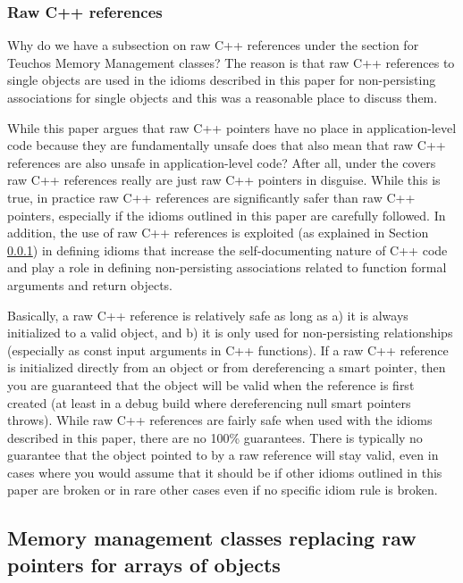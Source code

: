 \documentclass[pdf,ps2pdf,11pt]{SANDreport}
\begin{document}
%
{}\subsubsection{Raw C++ references}
\label{sec:raw-C++-references}
%

Why do we have a subsection on raw C++ references under the section
for Teuchos Memory Management classes?  The reason is that raw C++
references to single objects are used in the idioms described in this
paper for non-persisting associations for single objects and this was
a reasonable place to discuss them.

While this paper argues that raw C++ pointers have no place in
application-level code because they are fundamentally unsafe does that
also mean that raw C++ references are also unsafe in application-level
code?  After all, under the covers raw C++ references really are just
raw C++ pointers in disguise.  While this is true, in practice raw C++
references are significantly safer than raw C++ pointers, especially
if the idioms outlined in this paper are carefully followed.  In
addition, the use of raw C++ references is exploited (as explained in
Section {}\ref{sec:raw-C++-references}) in defining idioms that
increase the self-documenting nature of C++ code and play a role in
defining non-persisting associations related to function formal
arguments and return objects.

Basically, a raw C++ reference is relatively safe as long as a) it is
always initialized to a valid object, and b) it is only used for
non-persisting relationships (especially as const input arguments in
C++ functions).  If a raw C++ reference is initialized directly from an
object or from dereferencing a smart pointer, then you are guaranteed
that the object will be valid when the reference is first created (at
least in a debug build where dereferencing null smart pointers
throws).  While raw C++ references are fairly safe when used with the
idioms described in this paper, there are no 100\% guarantees.  There
is typically no guarantee that the object pointed to by a raw reference
will stay valid, even in cases where you would assume that it should
be if other idioms outlined in this paper are broken or in rare other
cases even if no specific idiom rule is broken.


%
{}\subsection{Memory management classes replacing raw pointers for
arrays of objects}
\label{sec:array-classes}
%
\end{document}
